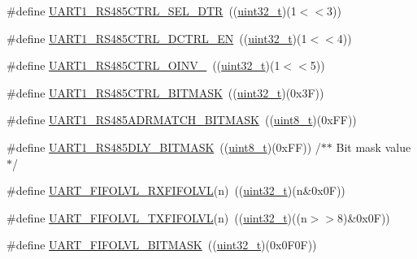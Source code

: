 \begin{DoxyCompactItemize}
\item 
\#define \hyperlink{group___u_a_r_t___private___macros_gacb179ac97fb8aacbea2cf116bc671477}{U\+A\+R\+T1\+\_\+\+R\+S485\+C\+T\+R\+L\+\_\+\+S\+E\+L\+\_\+\+D\+TR}~((\hyperlink{_p_e___types_8h_a33594304e786b158f3fb30289278f5af}{uint32\+\_\+t})(1$<$$<$3))
\item 
\#define \hyperlink{group___u_a_r_t___private___macros_ga4fc9e8ce0ea18bc5ae717d3d00ec02eb}{U\+A\+R\+T1\+\_\+\+R\+S485\+C\+T\+R\+L\+\_\+\+D\+C\+T\+R\+L\+\_\+\+EN}~((\hyperlink{_p_e___types_8h_a33594304e786b158f3fb30289278f5af}{uint32\+\_\+t})(1$<$$<$4))
\item 
\#define \hyperlink{group___u_a_r_t___private___macros_ga576582c10c8fc016f90b548a45e565a7}{U\+A\+R\+T1\+\_\+\+R\+S485\+C\+T\+R\+L\+\_\+\+O\+I\+N\+V\+\_}~((\hyperlink{_p_e___types_8h_a33594304e786b158f3fb30289278f5af}{uint32\+\_\+t})(1$<$$<$5))
\item 
\#define \hyperlink{group___u_a_r_t___private___macros_ga0ac8cbd1ed106b8867caf9d127d0eca2}{U\+A\+R\+T1\+\_\+\+R\+S485\+C\+T\+R\+L\+\_\+\+B\+I\+T\+M\+A\+SK}~((\hyperlink{_p_e___types_8h_a33594304e786b158f3fb30289278f5af}{uint32\+\_\+t})(0x3\+F))
\item 
\#define \hyperlink{group___u_a_r_t___private___macros_ga11af35ea993b841f116337dde36aeaa9}{U\+A\+R\+T1\+\_\+\+R\+S485\+A\+D\+R\+M\+A\+T\+C\+H\+\_\+\+B\+I\+T\+M\+A\+SK}~((\hyperlink{_p_e___types_8h_aba7bc1797add20fe3efdf37ced1182c5}{uint8\+\_\+t})(0x\+F\+F))
\item 
\#define \hyperlink{group___u_a_r_t___private___macros_ga0c75389e18ebd47c99cac42f7b6bee09}{U\+A\+R\+T1\+\_\+\+R\+S485\+D\+L\+Y\+\_\+\+B\+I\+T\+M\+A\+SK}~((\hyperlink{_p_e___types_8h_aba7bc1797add20fe3efdf37ced1182c5}{uint8\+\_\+t})(0x\+F\+F)) 	/$\ast$$\ast$ Bit mask value $\ast$/
\item 
\#define \hyperlink{group___u_a_r_t___private___macros_gabe06893620e5b031b884dbe67d7d5f81}{U\+A\+R\+T\+\_\+\+F\+I\+F\+O\+L\+V\+L\+\_\+\+R\+X\+F\+I\+F\+O\+L\+VL}(n)~((\hyperlink{_p_e___types_8h_a33594304e786b158f3fb30289278f5af}{uint32\+\_\+t})(n\&0x0\+F))
\item 
\#define \hyperlink{group___u_a_r_t___private___macros_gaa992b8fb5dd2279886a116d571de775b}{U\+A\+R\+T\+\_\+\+F\+I\+F\+O\+L\+V\+L\+\_\+\+T\+X\+F\+I\+F\+O\+L\+VL}(n)~((\hyperlink{_p_e___types_8h_a33594304e786b158f3fb30289278f5af}{uint32\+\_\+t})((n$>$$>$8)\&0x0\+F))
\item 
\#define \hyperlink{group___u_a_r_t___private___macros_ga82a3ea474232bf0d4f9811099ab6e236}{U\+A\+R\+T\+\_\+\+F\+I\+F\+O\+L\+V\+L\+\_\+\+B\+I\+T\+M\+A\+SK}~((\hyperlink{_p_e___types_8h_a33594304e786b158f3fb30289278f5af}{uint32\+\_\+t})(0x0\+F0\+F))
$$
\end{DoxyCompactItemize}
